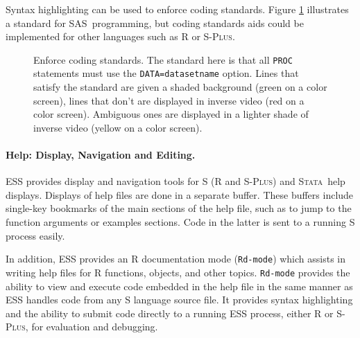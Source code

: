 \documentclass{article}
\newcommand*{\SAS}{\textsc{SAS}}
\newcommand*{\Splus}{\textsc{S-Plus}}
\newcommand*{\Stata}{\textsc{Stata}}
\newcommand{\stexttt}[1]{{\small\texttt{#1}}}
\begin{document}
Syntax highlighting can be used to enforce coding standards.  Figure
\ref{fig:hilock} illustrates a standard for \SAS\ programming, but
coding standards aids could be implemented for other languages such as
R or \Splus.


\begin{figure}[tbp]
  \caption{Enforce coding standards.  The standard here is
    that all \stexttt{PROC} statements must use the
    \stexttt{DATA=datasetname} option.  Lines that satisfy the
    standard are given a shaded background (green on a color screen),
    lines that don't are displayed in inverse video (red on a color
    screen).  Ambiguous ones are displayed in a lighter shade of
    inverse video (yellow on a color screen).}
  \label{fig:hilock}
\end{figure}

\paragraph{Help: Display, Navigation and Editing.}
ESS provides display and navigation tools for S (R and \Splus) and
\Stata\ help displays.  Displays of help files are done in a separate
buffer.  These buffers include single-key bookmarks of the main
sections of the help file, such as to jump to the function arguments or
examples sections.  Code in the latter is sent to a running S process
easily. %

In addition, ESS provides an R documentation mode (\stexttt{Rd-mode})
which assists in writing help files for R functions, objects, and
other topics.  \stexttt{Rd-mode} provides the ability to view and
execute code embedded in the help file in the same manner as ESS
handles code from any S language source file.  It provides syntax
highlighting and the ability to submit code directly to a running ESS
process, either R or \Splus, for evaluation and debugging.
\end{document}
